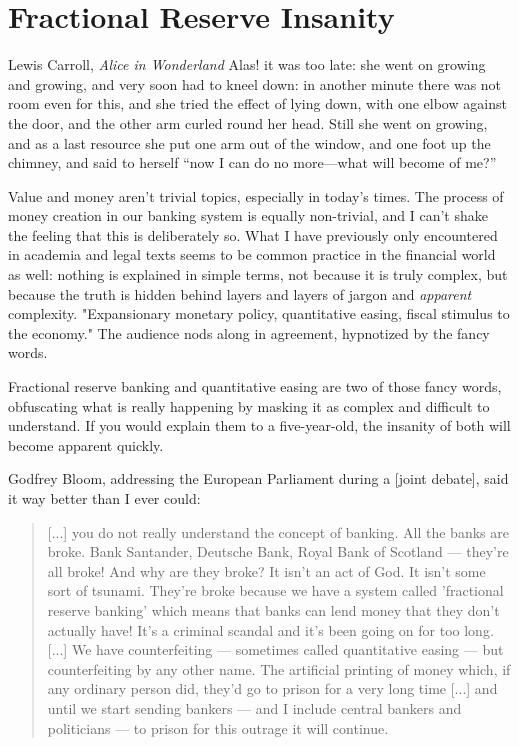 \chapter{ Fractional Reserve Insanity}
\label{les:13}

\begin{chapquote}{Lewis Carroll, \textit{Alice in Wonderland}}
Alas! it was too late: she went on growing and growing, and very soon had to
kneel down: in another minute there was not room even for this, and she tried
the effect of lying down, with one elbow against the door, and the other arm
curled round her head. Still she went on growing, and as a last resource she put
one arm out of the window, and one foot up the chimney, and said to herself
``now I can do no more—what will become of me?''
\end{chapquote}

Value and money aren't trivial topics, especially in today's times. The
process of money creation in our banking system is equally non-trivial,
and I can't shake the feeling that this is deliberately so. What I have
previously only encountered in academia and legal texts seems to be
common practice in the financial world as well: nothing is explained in
simple terms, not because it is truly complex, but because the truth is
hidden behind layers and layers of jargon and \textit{apparent} complexity.
"Expansionary monetary policy, quantitative easing, fiscal stimulus to
the economy." The audience nods along in agreement, hypnotized by the
fancy words.

Fractional reserve banking and quantitative easing are two of those
fancy words, obfuscating what is really happening by masking it as
complex and difficult to understand. If you would explain them to a
five-year-old, the insanity of both will become apparent quickly.

Godfrey Bloom, addressing the European Parliament during a [joint
debate], said it way better than I ever could:

\begin{quotation}
[...] you do not really understand the concept of banking. All the
banks are broke. Bank Santander, Deutsche Bank, Royal Bank of
Scotland --- they're all broke! And why are they broke? It isn't an
act of God. It isn't some sort of tsunami. They're broke because we
have a system called 'fractional reserve banking' which means that
banks can lend money that they don't actually have! It's a criminal
scandal and it's been going on for too long. [...]
We have counterfeiting --- sometimes called quantitative
easing --- but counterfeiting by any other name. The artificial
printing of money which, if any ordinary person did, they'd go to
prison for a very long time [...] and until we start sending
bankers --- and I include central bankers and politicians --- to
prison for this outrage it will continue.
\end{quotation}

